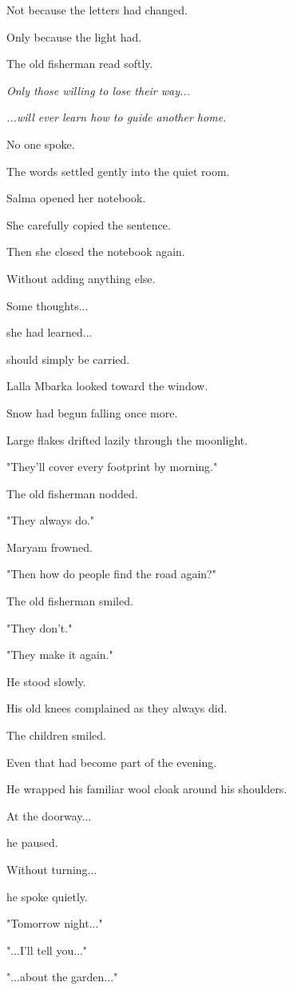 \documentclass[12pt,openany]{book}
\begin{document}
Not because the letters had changed.

Only because the light had.

The old fisherman read softly.

\emph{Only those willing to lose their way...}

\emph{...will ever learn how to guide another home.}

No one spoke.

The words settled gently into the quiet room.

Salma opened her notebook.

She carefully copied the sentence.

Then she closed the notebook again.

Without adding anything else.

Some thoughts...

she had learned...

should simply be carried.

Lalla Mbarka looked toward the window.

Snow had begun falling once more.

Large flakes drifted lazily through the moonlight.

"They'll cover every footprint by morning."

The old fisherman nodded.

"They always do."

Maryam frowned.

"Then how do people find the road again?"

The old fisherman smiled.

"They don't."

"They make it again."

He stood slowly.

His old knees complained as they always did.

The children smiled.

Even that had become part of the evening.

He wrapped his familiar wool cloak around his shoulders.

At the doorway...

he paused.

Without turning...

he spoke quietly.

"Tomorrow night..."

"...I'll tell you..."

"...about the garden..."
\end{document}
